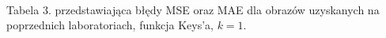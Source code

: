 \documentclass[14pt]{article}
\begin{document}
\begin{center}
\begin{tabular}{|c|c|c|c|c|}
        \end{tabular}
        \vspace{0.2cm}
        \\ \small Tabela 3. przedstawiająca błędy MSE oraz MAE 
        dla obrazów uzyskanych na poprzednich laboratoriach, funkcja Keys'a, $k=1$.
\end{center}
\end{document}
